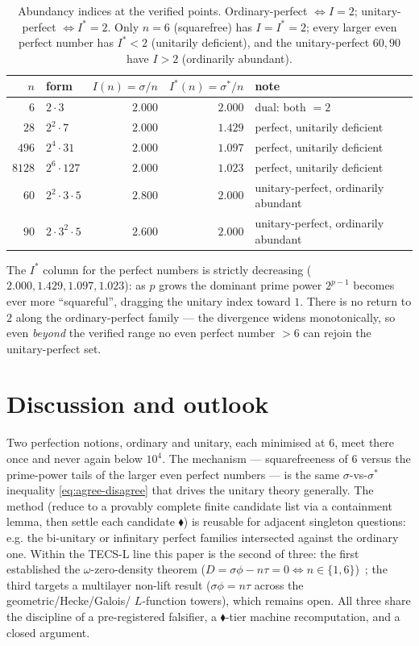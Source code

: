 \documentclass[11pt,a4paper]{article}
\newcommand{\sig}{\sigma}
\newcommand{\sigs}{\sigma^{*}}
\newcommand{\formal}{\textcolor{blue!60!black}{$\blacklozenge$}}
\theoremstyle{plain}
\theoremstyle{definition}
\begin{document}
\begin{table}[h]
\centering
\caption{Abundancy indices at the verified points. Ordinary-perfect $\iff
I=2$; unitary-perfect $\iff I^{*}=2$. Only $n=6$ (squarefree) has $I=I^{*}=2$;
every larger even perfect number has $I^{*}<2$ (unitarily deficient), and the
unitary-perfect $60,90$ have $I>2$ (ordinarily abundant).}
\label{tab:idx}
\begin{tabular}{rl rr l}
\toprule
$n$ & form & $I(n)=\sig/n$ & $I^{*}(n)=\sigs/n$ & note\\
\midrule
$6$    & $2\cdot3$          & $2.000$ & $2.000$ & dual: both $=2$\\
$28$   & $2^2\cdot7$        & $2.000$ & $1.429$ & perfect, unitarily deficient\\
$496$  & $2^4\cdot31$       & $2.000$ & $1.097$ & perfect, unitarily deficient\\
$8128$ & $2^6\cdot127$      & $2.000$ & $1.023$ & perfect, unitarily deficient\\
$60$   & $2^2\cdot3\cdot5$  & $2.800$ & $2.000$ & unitary-perfect, ordinarily abundant\\
$90$   & $2\cdot3^2\cdot5$  & $2.600$ & $2.000$ & unitary-perfect, ordinarily abundant\\
\bottomrule
\end{tabular}
\end{table}

\noindent The $I^{*}$ column for the perfect numbers is strictly decreasing
($2.000,1.429,1.097,1.023$): as $p$ grows the dominant prime power $2^{p-1}$
becomes ever more ``squareful'', dragging the unitary index toward $1$. There is
no return to $2$ along the ordinary-perfect family --- the divergence widens
monotonically, so even \emph{beyond} the verified range no even perfect number
$>6$ can rejoin the unitary-perfect set.

\section{Discussion and outlook}
\label{sec:discussion}

Two perfection notions, ordinary and unitary, each minimised at $6$, meet there
once and never again below $10^4$. The mechanism --- squarefreeness of $6$
versus the prime-power tails of the larger even perfect numbers --- is the same
$\sig$-vs-$\sigs$ inequality \eqref{eq:agree-disagree} that drives the unitary
theory generally. The method (reduce to a provably complete finite candidate
list via a containment lemma, then settle each candidate \formal) is reusable
for adjacent singleton questions: e.g. the bi-unitary or infinitary perfect
families intersected against the ordinary one. Within the TECS-L line this paper
is the second of three: the first established the $\omega$-zero-density theorem
($D=\sig\phi-n\tau=0\iff n\in\{1,6\}$)~\citep{tecsLozd}; the third targets a
multilayer non-lift result ($\sig\phi=n\tau$ across the geometric/Hecke/Galois/
$L$-function towers), which remains open. All three share the discipline of a
pre-registered falsifier, a \formal-tier machine recomputation, and a closed
argument.
\end{document}
